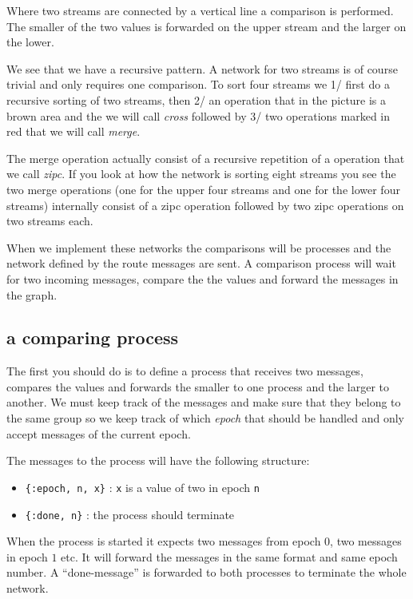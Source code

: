 \documentclass[a4paper,11pt]{article}
\begin{document}
  Where two streams are connected by a vertical line a comparison is
  performed. The smaller of the two values is forwarded on the upper
  stream and the larger on the lower.

We see that we have a recursive pattern. A network for two streams is
of course trivial and only requires one comparison. To sort four
streams we 1/ first do a recursive sorting of two streams, then 2/ an
operation that in the picture is a brown area and the we will call
{\em cross} followed by 3/ two operations marked in red that we will
call {\em merge}.

The merge operation actually consist of a recursive repetition of a
  operation that we call {\em zipc}. If you look at how the network is
  sorting eight streams you see the two merge operations (one for the
  upper four streams and one for the lower four streams) internally
  consist of a zipc operation followed by two zipc operations on two
  streams each.


When we implement these networks the comparisons will be processes
  and the network defined by the route messages are sent. A comparison
  process will wait for two incoming messages, compare the the values
  and forward the messages in the graph.


\subsection{a comparing process}

The first you should do is to define a process that receives two
  messages, compares the values and forwards the smaller to one
  process and the larger to another. We must keep track of the
  messages and make sure that they belong to the same group so we keep
  track of which {\em epoch} that should be handled and only accept
  messages of the current epoch.




The messages to the process will have the following structure:

\begin{itemize}
\item {\tt \{:epoch, n, x\}} :  {\tt x} is a value of two in epoch {\tt n}
\item {\tt \{:done, n\}}  : the process should terminate
\end{itemize}

When the process is started it expects two messages from epoch $0$,
  two messages in epoch $1$ etc. It will forward the messages in the
  same format and same epoch number. A ``done-message'' is forwarded
  to both processes to terminate the whole network.
\end{document}
